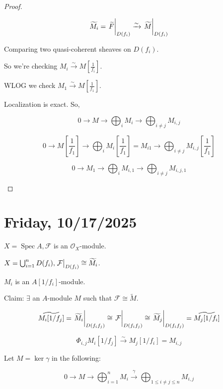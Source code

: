 \documentclass{article}
\theoremstyle{definition}
\begin{document}
\begin{proof}
\begin{enumerate}[label=\arabic*)]
            \[
                \widetilde{M}_i = \eval{\widetilde{F}}_{D(f_i)} \xrightarrow{\sim} \eval{\widetilde{M}}_{D(f_i)}
            \]

            Comparing two quasi-coherent sheaves on \(D(f_i)\).

            So we're checking \(M_i \xrightarrow{\sim} M \left[ \frac{1}{f_i} \right]\).

            WLOG we check \(M_1 \xrightarrow{\sim} M \left[ \frac{1}{f_1} \right]\).

            Localization is exact. So,

            \[
                0 \to M \to \bigoplus_{i} M_i \to \bigoplus_{i\neq j} M_{i,j} 
            \]

            \[
                0 \to M\left[ \frac{1}{f_1} \right]  \to \bigoplus_{i} M_i \left[ \frac{1}{f_1} \right] = M_{i1} \to \bigoplus_{i\neq j} M_{i,j} \left[ \frac{1}{f_1} \right]   
            \]

            \[
                0 \to M_1 \to \bigoplus_{i} M_{i,1} \to \bigoplus_{i\neq j} M_{i,j,1}
            \]

        \end{enumerate} 
    \end{proof}

    \section*{Friday, 10/17/2025}
    
    \(X = \operatorname{Spec} A, \mathcal{F}\) is an \(\mathcal{O}_X\)-module.

    \(X = \bigcup_{i=1}^n D(f_i), \eval{\mathcal{F}}_{D(f_i)} \cong \widetilde{M}_i\).

    \(M_i\) is an \(A[1 / f_i]\)-module.

    Claim: \(\exists\) an \(A\)-module \(M\) such that \(\mathcal{F} \cong \widetilde{M}\).

    \[
        \widetilde{M_i[1 / f_j]} = \eval{\widetilde{M}_i}_{D(f_i f_j)} \cong \eval{\mathcal{F}}_{D(f_i f_j)} \cong \eval{\widetilde{M}_j}_{D(f_i f_j)} = \widetilde{M_j[1 / f_i]}  
    \]

    \[
        \Phi_{i,j} M_i[1 / f_j] \xrightarrow{\sim} M_j[1 / f_i] = M_{i,j} 
    \]

    Let \(M = \ker \gamma\) in the following:

    \[
        0 \to M \to \bigoplus_{i=1}^n M_i \xrightarrow{\gamma} \bigoplus_{1 \leq i\neq j \leq n} M_{i,j}
    \]
\end{document}
